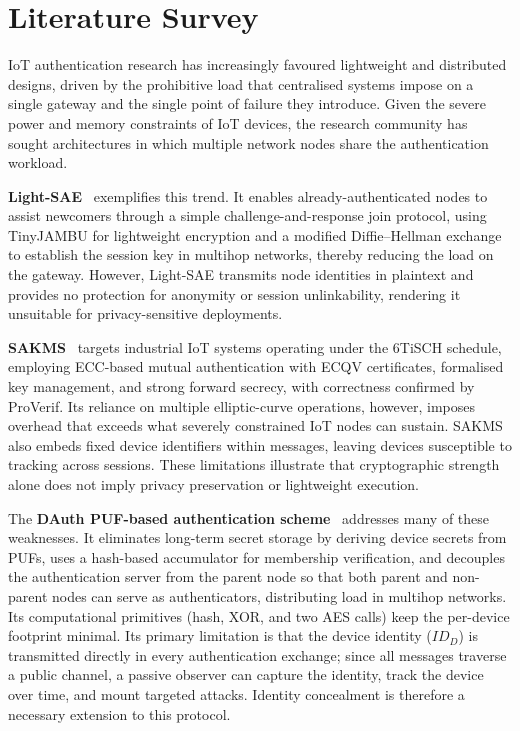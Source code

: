 \chapter{Literature Survey}

IoT authentication research has increasingly favoured lightweight and distributed
designs, driven by the prohibitive load that centralised systems impose on a single
gateway and the single point of failure they introduce.
Given the severe power and memory constraints of IoT devices, the research community
has sought architectures in which multiple network nodes share the authentication
workload.

\textbf{Light-SAE}~\cite{rosa2023lightsae} exemplifies this trend.
It enables already-authenticated nodes to assist newcomers through a simple
challenge-and-response join protocol, using TinyJAMBU for lightweight encryption
and a modified Diffie--Hellman exchange to establish the session key in multihop
networks, thereby reducing the load on the gateway.
However, Light-SAE transmits node identities in plaintext and provides no
protection for anonymity or session unlinkability, rendering it unsuitable for
privacy-sensitive deployments.

\textbf{SAKMS}~\cite{yang2024sakms} targets industrial IoT systems operating under
the 6TiSCH schedule, employing ECC-based mutual authentication with ECQV
certificates, formalised key management, and strong forward secrecy, with
correctness confirmed by ProVerif.
Its reliance on multiple elliptic-curve operations, however, imposes overhead that
exceeds what severely constrained IoT nodes can sustain.
SAKMS also embeds fixed device identifiers within messages, leaving devices
susceptible to tracking across sessions.
These limitations illustrate that cryptographic strength alone does not imply
privacy preservation or lightweight execution.

The \textbf{DAuth PUF-based authentication scheme}~\cite{das2026comsnets}
addresses many of these weaknesses.
It eliminates long-term secret storage by deriving device secrets from PUFs, uses
a hash-based accumulator for membership verification, and decouples the
authentication server from the parent node so that both parent and non-parent nodes
can serve as authenticators, distributing load in multihop networks.
Its computational primitives (hash, XOR, and two AES calls) keep the
per-device footprint minimal.
Its primary limitation is that the device identity ($ID_D$) is transmitted directly
in every authentication exchange; since all messages traverse a public channel, a
passive observer can capture the identity, track the device over time, and mount
targeted attacks.
Identity concealment is therefore a necessary extension to this protocol.

